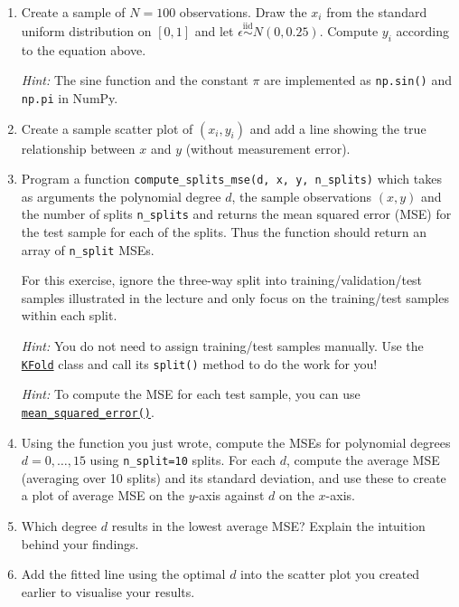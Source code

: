 \documentclass{scrartcl}
\begin{document}
\begin{enumerate}
\def\labelenumi{\arabic{enumi}.}
\item
  Create a sample of \(N=100\) observations. Draw the \(x_i\) from the
  standard uniform distribution on \([0, 1]\) and let
  \(\epsilon \stackrel{\text{iid}}{\sim} N(0, 0.25)\). Compute \(y_i\)
  according to the equation above.

  \emph{Hint:} The sine function and the constant \(\pi\) are
  implemented as \texttt{np.sin()} and \texttt{np.pi} in NumPy.
\item
  Create a sample scatter plot of \((x_i, y_i)\) and add a line showing
  the true relationship between \(x\) and \(y\) (without measurement
  error).
\item
  Program a function
  \texttt{compute\_splits\_mse(d,\ x,\ y,\ n\_splits)} which takes as
  arguments the polynomial degree \(d\), the sample observations
  \((x, y)\) and the number of splits \texttt{n\_splits} and returns the
  mean squared error (MSE) for the test sample for each of the splits.
  Thus the function should return an array of \texttt{n\_split} MSEs.

  For this exercise, ignore the three-way split into
  training/validation/test samples illustrated in the lecture and only
  focus on the training/test samples within each split.

  \emph{Hint:} You do not need to assign training/test samples manually.
  Use the
  \href{https://scikit-learn.org/stable/modules/generated/sklearn.model_selection.KFold.html}{\texttt{KFold}}
  class and call its \texttt{split()} method to do the work for you!

  \emph{Hint:} To compute the MSE for each test sample, you can use
  \href{https://scikit-learn.org/stable/modules/generated/sklearn.metrics.mean_squared_error.html}{\texttt{mean\_squared\_error()}}.
\item
  Using the function you just wrote, compute the MSEs for polynomial
  degrees \(d = 0,\dots,15\) using \texttt{n\_split=10} splits. For each
  \(d\), compute the average MSE (averaging over 10 splits) and its
  standard deviation, and use these to create a plot of average MSE on
  the \(y\)-axis against \(d\) on the \(x\)-axis.
\item
  Which degree \(d\) results in the lowest average MSE? Explain the
  intuition behind your findings.
\item
  Add the fitted line using the optimal \(d\) into the scatter plot you
  created earlier to visualise your results.
\end{enumerate}
\end{document}
